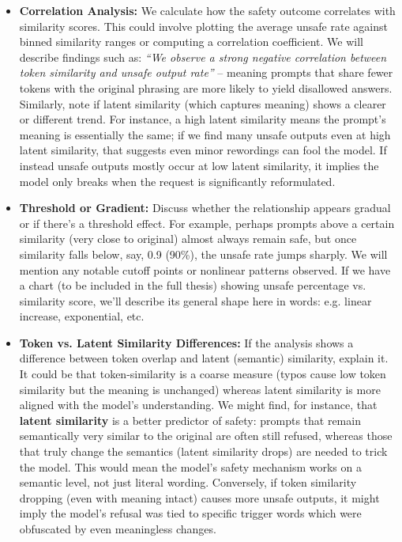 \begin{itemize}
  \item \textbf{Correlation Analysis:} We calculate how the safety outcome correlates with similarity scores. This could involve plotting the average unsafe rate against binned similarity ranges or computing a correlation coefficient. We will describe findings such as: \textit{“We observe a strong negative correlation between token similarity and unsafe output rate”} – meaning prompts that share fewer tokens with the original phrasing are more likely to yield disallowed answers. Similarly, note if latent similarity (which captures meaning) shows a clearer or different trend. For instance, a high latent similarity means the prompt’s meaning is essentially the same; if we find many unsafe outputs even at high latent similarity, that suggests even minor rewordings can fool the model. If instead unsafe outputs mostly occur at low latent similarity, it implies the model only breaks when the request is significantly reformulated.

  \item \textbf{Threshold or Gradient:} Discuss whether the relationship appears gradual or if there’s a threshold effect. For example, perhaps prompts above a certain similarity (very close to original) almost always remain safe, but once similarity falls below, say, 0.9 (90\%), the unsafe rate jumps sharply. We will mention any notable cutoff points or nonlinear patterns observed. If we have a chart (to be included in the full thesis) showing unsafe percentage vs. similarity score, we’ll describe its general shape here in words: e.g. linear increase, exponential, etc.

  \item \textbf{Token vs. Latent Similarity Differences:} If the analysis shows a difference between token overlap and latent (semantic) similarity, explain it. It could be that token\--similarity is a coarse measure (typos cause low token similarity but the meaning is unchanged) whereas latent similarity is more aligned with the model’s understanding. We might find, for instance, that \textbf{latent similarity} is a better predictor of safety: prompts that remain semantically very similar to the original are often still refused, whereas those that truly change the semantics (latent similarity drops) are needed to trick the model. This would mean the model’s safety mechanism works on a semantic level, not just literal wording. Conversely, if token similarity dropping (even with meaning intact) causes more unsafe outputs, it might imply the model’s refusal was tied to specific trigger words which were obfuscated by even meaningless changes.


\end{itemize}
